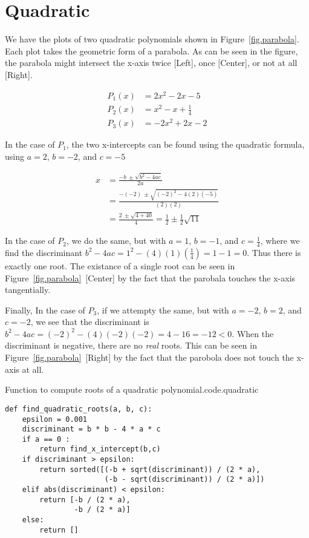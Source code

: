 \section{Quadratic}
\label{sec.quadratic}


We have the plots of two quadratic polynomials shown in Figure~\ref{fig.parabola}.
Each plot takes the geometric form of a parabola.  As can be seen in the figure,
the parabola might intersect the x-axis twice [Left], once [Center], or not at all [Right].

\begin{align*}
  P_1(x) &= 2x^2 - 2 x - 5\\
  P_2(x) &= x^2 -x + \frac{1}{4}\\
  P_3(x) &=  -2x^2 + 2x -2
\end{align*}



In the case of $P_1$, the two x-intercepts can be found using the quadratic formula, using $a=2$, $b=-2$, and $c=-5$

\begin{align*}
  x &= \frac{-b~ \pm \sqrt{b^2 - 4a c}}{2a}\\
  &= \frac{-(-2)~ \pm \sqrt{(-2)^2 - 4 (2) (-5)}}{(2)(2)}\\
  &= \frac{2 ~\pm \sqrt{4 + 40}}{4}
  = \frac{1}{2} \pm \frac{1}{2}\sqrt{11}
\end{align*}

In the case of $P_2$, we do the same, but with $a=1$, $b=-1$, and
$c=\frac{1}{4}$, where we find the discriminant $b^2 - 4a c = 1^2 -
(4)(1)(\frac{1}{4}) = 1 - 1 = 0$.  Thus there is exactly one root.
The existance of a single root can be seen in
Figure~\ref{fig.parabola}~[Center] by the fact that the parobala
touches the x-axis tangentially.

Finally, In the case of $P_3$, if we attempty the same, but with $a=-2$, $b=2$, and $c=-2$, we see
that the discriminant is $b^2 - 4a c = (-2)^2 - (4)(-2)(-2) = 4 - 16 = -12 < 0$.  When the discriminant
is negative, there are no \emph{real} roots.  This can be seen in
Figure~\ref{fig.parabola}~[Right] by the fact that the parobola does not
touch the x-axis at all.

\begin{listing}{Function to compute roots of a quadratic polynomial.}{code.quadratic}
\begin{minipage}[c]{0.95\textwidth}\begin{lstlisting}
def find_quadratic_roots(a, b, c):
    epsilon = 0.001
    discriminant = b * b - 4 * a * c
    if a == 0 :
        return find_x_intercept(b,c)
    if discriminant > epsilon:
        return sorted([(-b + sqrt(discriminant)) / (2 * a),
                       (-b - sqrt(discriminant)) / (2 * a)])
    elif abs(discriminant) < epsilon:
        return [-b / (2 * a), 
                -b / (2 * a)]
    else:
        return []
\end{lstlisting}\end{minipage}\end{listing}

